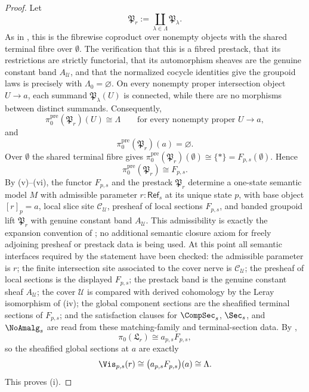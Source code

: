 \begin{proof}
Let
\[
\mathfrak P_r:=\coprod_{\lambda\in\Lambda}\mathfrak P_\lambda.
\]
As in , this is the fibrewise
coproduct over nonempty objects with the shared terminal fibre over
$\emptyset$.
The verification that this is a fibred prestack, that its restrictions are strictly functorial, that its automorphism sheaves are the genuine constant band $A_{\mathcal U}$, and that the normalized cocycle identities give the groupoid laws is precisely  with $\Lambda_0=\varnothing$. On every nonempty proper intersection object $U\to a$, each summand $\mathfrak P_\lambda(U)$ is connected, while there are no morphisms between distinct summands. Consequently,
\[
\pi_0^{\mathrm{pre}}(\mathfrak P_r)(U)\cong \Lambda
\qquad
\text{for every nonempty proper }U\to a,
\]
and
\[
\pi_0^{\mathrm{pre}}(\mathfrak P_r)(a)=\varnothing.
\]
Over $\emptyset$ the shared terminal fibre gives
$\pi_0^{\mathrm{pre}}(\mathfrak P_r)(\emptyset)\cong\{\ast\}=F_{p,s}(\emptyset)$.
Hence
\[
\pi_0^{\mathrm{pre}}(\mathfrak P_r)\cong F_{p,s}.
\]
By (v)--(vi), the functor
$F_{p,s}$ and the prestack $\mathfrak P_r$ determine a one-state semantic
model $M$ with admissible parameter $r:\mathsf{Ref}_s$ at its unique state $p$,
with base object $[r]_p=a$, local slice site $\mathcal C_{\mathcal U}$,
presheaf of local sections $F_{p,s}$, and banded groupoid lift $\mathfrak P_r$ with
genuine constant band $A_{\mathcal U}$. This admissibility is exactly the expansion convention of
; no additional semantic
closure axiom for freely adjoining presheaf or prestack data is being used.
At this point all semantic interfaces required by the statement have been checked: the admissible parameter is $r$; the finite intersection site associated to the cover nerve is $\mathcal C_{\mathcal U}$; the presheaf of local sections is the displayed $F_{p,s}$; the prestack band is the genuine constant sheaf $A_{\mathcal U}$; the cover $\mathcal U$ is compared with derived cohomology by the Leray isomorphism of (iv); the global component sections are the sheafified terminal sections of $F_{p,s}$; and the satisfaction clauses for $\CompSec_s$, $\Sec_s$, and $\NoAmalg_s$ are read from these matching-family and terminal-section data.
By ,
\[
\pi_0(\mathfrak L_r)\cong a_{p,s}F_{p,s},
\]
so the sheafified global sections at $a$ are exactly
\[
\Vis_{p,s}(r)\cong \bigl(a_{p,s}F_{p,s}\bigr)(a)\cong \Lambda.
\]
This proves \textup{(i)}.


\end{proof}
